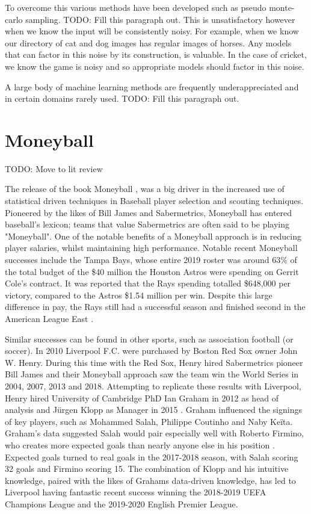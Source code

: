 \documentclass[12pt,a4paper]{report}
\theoremstyle{definition}
\begin{document}
To overcome this various methods have been developed such as pseudo monte-carlo sampling. 
TODO: Fill this paragraph out. 
This is unsatisfactory however when we know the input will be consistently noisy. 
For example, when we know our directory of cat and dog images has regular images of horses.
Any models that can factor in this noise by its construction, is valuable.
In the case of cricket, we know the game is noisy and so appropriate models should factor in this noise.

A large body of machine learning methods are frequently underappreciated and in certain domains rarely used.
TODO: Fill this paragraph out.

\section{Moneyball}

TODO: Move to lit review

The release of the book Moneyball \citep{Moneyball2004}, was a big driver in the increased use of statistical driven techniques in Baseball player selection and scouting techniques. 
Pioneered by the likes of Bill James and Sabermetrics, Moneyball has entered baseball's lexicon; teams that value Sabermetrics are often said to be playing "Moneyball".  
One of the notable benefits of a Moneyball approach is in reducing player salaries, whilst maintaining high performance. 
Notable recent Moneyball successes include the Tampa Bays, whose entire 2019 roster was around 63\% of the total budget of the \$40 million the Houston Astros were spending on Gerrit Cole's contract. 
It was reported that the Rays spending totalled \$648,000 per victory, compared to the Astros \$1.54 million per win.
Despite this large difference in pay, the Rays still had a successful season and finished second in the American League East \citep{Fox2019}.

Similar successes can be found in other sports, such as association football (or soccer). 
In 2010 Liverpool F.C. were purchased by Boston Red Sox owner John W. Henry. 
During this time with the Red Sox, Henry hired Sabermetrics pioneer Bill James and their Moneyball approach saw the team win the World Series in 2004, 2007, 2013 and 2018. 
Attempting to replicate these results with Liverpool, Henry hired University of Cambridge PhD Ian Graham in 2012 as head of analysis and J\"urgen Klopp as Manager in 2015 \citep{Liverpool2022}. 
Graham influenced the signings of key players, such as Mohammed Salah, Philippe Coutinho and Naby Ke\"ita. 
Graham's data suggested Salah would pair especially well with Roberto Firmino, who creates more expected goals than nearly anyone else in his position \citep{Liverpool2019}. 
Expected goals turned to real goals in the 2017-2018 season, with Salah scoring 32 goals and Firmino scoring 15. 
The combination of Klopp and his intuitive knowledge, paired with the likes of Grahams data-driven knowledge, has led to Liverpool having fantastic recent success winning the 2018-2019 UEFA Champions League and the 2019-2020 English Premier League.
\end{document}
